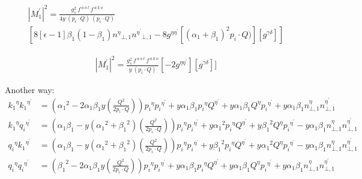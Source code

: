 \begin{equation}
\begin{split}
{|{M}^{\prime}_1|}^2 =\frac{g_s^2 \:f^{\:a\:o\:l}\: f^{\:a\:k\:o}}{4y\:(p_i\cdot Q) \:(p_i\cdot Q)} \\
[8[\epsilon-1]{\beta_1}(1-\beta_1){n^{{\eta}}}_{\bot,1}{n^{{\eta}^{\prime}}}_{\bot,1}-8g^{{\eta}{{\eta}^{\prime}}}[({\alpha_1}+{\beta_1})^2 p_i \cdot Q)][g^{{\gamma}{{\delta}}}]]
\end{split}
\end{equation}

\begin{equation}
\begin{split}
{|{M}^{\prime}_1|}^2 =\frac{g_s^2 \:f^{\:a\:o\:l}\: f^{\:a\:k\:o}}{y\:(p_i\cdot Q)}[-2g^{{\eta}{{\eta}^{\prime}}}][g^{{\gamma}{{\delta}}}]]
\end{split}
\end{equation}

\pagebreak

Another way:
\begin{equation}
\begin{split}
{k_1}^{{\eta}}{k_1}^{{\eta}^{\prime}}&=({\alpha_1}^2 -2\alpha_1 \beta_1 y(\frac{Q^2}{2 p_i \cdot Q})){p_i}^{{\eta}}{p_i}^{{\eta}^{\prime}}+y\alpha_1 \beta_1 {p_i}^{{\eta}}{Q}^{{\eta}^{\prime}}+y\alpha_1 \beta_1 {Q}^{{\eta}}{p_i}^{{\eta}^{\prime}}+y\alpha_1\beta_1 {n}^{{\eta}}_{\bot,1}{n}^{{\eta}^{\prime}}_{\bot,1}\\
{k_1}^{{\eta}}{q_i}^{{\eta}^{\prime}}&=({\alpha_1}\beta_1 -y({\alpha_1}^2 + {\beta_1}^2 )(\frac{Q^2}{2 p_i \cdot Q})){p_i}^{{\eta}}{p_i}^{{\eta}^{\prime}}+y{\alpha_1}^2 {p_i}^{{\eta}}{Q}^{{\eta}^{\prime}}+y{\beta_1}^2 {Q}^{{\eta}}{p_i}^{{\eta}^{\prime}}-y\alpha_1\beta_1 {n}^{{\eta}}_{\bot,1}{n}^{{\eta}^{\prime}}_{\bot,1}\\
{q_i}^{{\eta}}{k_1}^{{\eta}^{\prime}}&=({\alpha_1}\beta_1 -y({\alpha_1}^2 + {\beta_1}^2 )(\frac{Q^2}{2 p_i \cdot Q})){p_i}^{{\eta}}{p_i}^{{\eta}^{\prime}}+y{\beta_1}^2 {p_i}^{{\eta}}{Q}^{{\eta}^{\prime}}+y{\alpha_1}^2 {Q}^{{\eta}}{p_i}^{{\eta}^{\prime}}-y\alpha_1\beta_1 {n}^{{\eta}}_{\bot,1}{n}^{{\eta}^{\prime}}_{\bot,1}\\
{q_i}^{{\eta}}{q_i}^{{\eta}^{\prime}}&=({\beta_1}^2 -2\alpha_1 \beta_1 y(\frac{Q^2}{2 p_i \cdot Q})){p_i}^{{\eta}}{p_i}^{{\eta}^{\prime}}+y\alpha_1 \beta_1 {p_i}^{{\eta}}{Q}^{{\eta}^{\prime}}+y\alpha_1 \beta_1 {Q}^{{\eta}}{p_i}^{{\eta}^{\prime}}+y\alpha_1\beta_1 {n}^{{\eta}}_{\bot,1}{n}^{{\eta}^{\prime}}_{\bot,1}
\end{split}
\end{equation}

